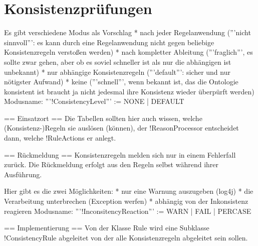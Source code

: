 \section{Konsistenzprüfungen}

Es gibt verschiedene Modus als Vorschlag
 * nach jeder Regelanwendung ('''nicht sinnvoll''': es kann durch eine Regelanwendung nicht gegen beliebige Konsistenzregeln verstoßen werden)
 * nach kompletter Ableitung ('''fraglich''', es sollte zwar gehen, aber ob es soviel schneller ist als nur die abhängigen ist unbekannt)
 * nur abhängige Konsistenzregeln ('''default''': sicher und nur nötigster Aufwand)
 * keine ('''schnell''', wenn bekannt ist, das die Ontologie konsistent ist braucht ja nicht jedesmal ihre Konsistenz wieder überpürft werden)
Modusname: '''!ConsistencyLevel''' := NONE | DEFAULT

== Einsatzort ==
Die Tabellen sollten hier auch wissen, welche (Konsistenz-)Regeln sie auslösen (können), der !ReasonProcessor entscheidet dann, welche !RuleActions er anlegt.

== Rückmeldung ==
Konsistenzregeln melden sich nur in einem Fehlerfall zurück. Die Rückmeldung erfolgt aus den Regeln selbst während ihrer Ausführung.

Hier gibt es die zwei Möglichkeiten:
 * nur eine Warnung auszugeben (log4j)
 * die Verarbeitung unterbrechen (Exception werfen)
 * abhängig von der Inkonsistenz reagieren
Modusname: '''!InconsitencyReaction''' := WARN | FAIL | PERCASE

== Implementierung ==
Von der Klasse Rule wird eine Subklasse !ConsistencyRule abgeleitet von der alle Konsistenzregeln abgeleitet sein sollen.